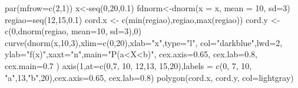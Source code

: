 \documentclass[
  letterpaper,
  DIV=11,
  numbers=noendperiod]{scrartcl}
\newenvironment{Shaded}{\begin{snugshade}}{\end{snugshade}}
\newcommand{\AttributeTok}[1]{\textcolor[rgb]{0.40,0.45,0.13}{#1}}
\newcommand{\DecValTok}[1]{\textcolor[rgb]{0.68,0.00,0.00}{#1}}
\newcommand{\FloatTok}[1]{\textcolor[rgb]{0.68,0.00,0.00}{#1}}
\newcommand{\FunctionTok}[1]{\textcolor[rgb]{0.28,0.35,0.67}{#1}}
\newcommand{\NormalTok}[1]{\textcolor[rgb]{0.00,0.23,0.31}{#1}}
\newcommand{\OtherTok}[1]{\textcolor[rgb]{0.00,0.23,0.31}{#1}}
\newcommand{\StringTok}[1]{\textcolor[rgb]{0.13,0.47,0.30}{#1}}
\begin{document}
\begin{Shaded}
\begin{Highlighting}[]
\FunctionTok{par}\NormalTok{(}\AttributeTok{mfrow=}\FunctionTok{c}\NormalTok{(}\DecValTok{2}\NormalTok{,}\DecValTok{1}\NormalTok{))}
\NormalTok{x}\OtherTok{\textless{}{-}}\FunctionTok{seq}\NormalTok{(}\DecValTok{0}\NormalTok{,}\DecValTok{20}\NormalTok{,}\FloatTok{0.1}\NormalTok{) }
\NormalTok{fdnorm}\OtherTok{\textless{}{-}}\FunctionTok{dnorm}\NormalTok{(}\AttributeTok{x =}\NormalTok{ x, }\AttributeTok{mean =} \DecValTok{10}\NormalTok{, }\AttributeTok{sd=}\DecValTok{3}\NormalTok{)   }
\NormalTok{regiao}\OtherTok{=}\FunctionTok{seq}\NormalTok{(}\DecValTok{12}\NormalTok{,}\DecValTok{15}\NormalTok{,}\FloatTok{0.1}\NormalTok{)}
\NormalTok{cord.x }\OtherTok{\textless{}{-}} \FunctionTok{c}\NormalTok{(}\FunctionTok{min}\NormalTok{(regiao),regiao,}\FunctionTok{max}\NormalTok{(regiao))}
\NormalTok{cord.y }\OtherTok{\textless{}{-}} \FunctionTok{c}\NormalTok{(}\DecValTok{0}\NormalTok{,}\FunctionTok{dnorm}\NormalTok{(regiao, }\AttributeTok{mean=}\DecValTok{10}\NormalTok{, }\AttributeTok{sd=}\DecValTok{3}\NormalTok{),}\DecValTok{0}\NormalTok{) }
\FunctionTok{curve}\NormalTok{(}\FunctionTok{dnorm}\NormalTok{(x,}\DecValTok{10}\NormalTok{,}\DecValTok{3}\NormalTok{),}\AttributeTok{xlim=}\FunctionTok{c}\NormalTok{(}\DecValTok{0}\NormalTok{,}\DecValTok{20}\NormalTok{),}\AttributeTok{xlab=}\StringTok{"x"}\NormalTok{,}\AttributeTok{type=}\StringTok{"l"}\NormalTok{, }
      \AttributeTok{col=}\StringTok{"darkblue"}\NormalTok{,}\AttributeTok{lwd=}\DecValTok{2}\NormalTok{, }\AttributeTok{ylab=}\StringTok{"f(x)"}\NormalTok{,}\AttributeTok{xaxt=}\StringTok{"n"}\NormalTok{,}\AttributeTok{main=}\StringTok{"P(a\textless{}X\textless{}b)"}\NormalTok{,}
      \AttributeTok{cex.axis=}\FloatTok{0.65}\NormalTok{, }\AttributeTok{cex.lab=}\FloatTok{0.8}\NormalTok{, }\AttributeTok{cex.main=}\FloatTok{0.7}\NormalTok{ ) }
\FunctionTok{axis}\NormalTok{(}\DecValTok{1}\NormalTok{,}\AttributeTok{at=}\FunctionTok{c}\NormalTok{(}\DecValTok{0}\NormalTok{,}\DecValTok{7}\NormalTok{, }\DecValTok{10}\NormalTok{, }\DecValTok{12}\NormalTok{,}\DecValTok{13}\NormalTok{, }\DecValTok{15}\NormalTok{,}\DecValTok{20}\NormalTok{),}\AttributeTok{labels =}
       \FunctionTok{c}\NormalTok{(}\DecValTok{0}\NormalTok{, }\DecValTok{7}\NormalTok{, }\DecValTok{10}\NormalTok{, }\StringTok{"a"}\NormalTok{,}\DecValTok{13}\NormalTok{,}\StringTok{"b"}\NormalTok{,}\DecValTok{20}\NormalTok{),}\AttributeTok{cex.axis=}\FloatTok{0.65}\NormalTok{, }\AttributeTok{cex.lab=}\FloatTok{0.8}\NormalTok{) }
\FunctionTok{polygon}\NormalTok{(cord.x, cord.y, }\AttributeTok{col=}\StringTok{\textquotesingle{}lightgray\textquotesingle{}}\NormalTok{)}


\end{Highlighting}
\end{Shaded}
\end{document}
